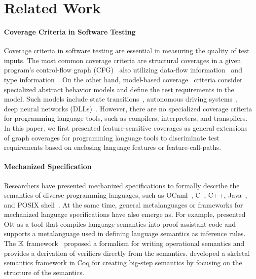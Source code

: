 \section{Related Work}\label{sec:related}

\paragraph{\textbf{Coverage Criteria in Software Testing}}
Coverage criteria in software testing are essential in measuring the quality of test inputs.
The most common coverage criteria are structural coverages in a given program's
control-flow graph (CFG)~\cite{cov-mcdc,cov-def} also utilizing
data-flow information~\cite{cov-dataflow} and type information~\cite{cov-partition}.
On the other hand, model-based coverage~\cite{cov-model-book} criteria consider
specialized abstract behavior models and define the test requirements in the model.
Such models include state transitions~\cite{cov-model-api},
autonomous driving systems~\cite{cov-param},
deep neural networks (DLLs)~\cite{cov-neuron,cov-k-neuron,cov-concolic-dll,
cov-fuzz-tensor, cov-fuzz-dl}.
However, there are no specialized coverage criteria for programming language
tools, such as compilers, interpreters, and transpilers.
In this paper, we first presented feature-sensitive coverages as general
extensions of graph coverages for programming language tools to discriminate
test requirements based on enclosing language features or feature-call-paths.


\paragraph{\textbf{Mechanized Specification}}

Researchers have presented mechanized specifications to formally describe the
semantics of diverse programming languages, such as
OCaml~\cite{ocaml-light-spec}, C~\cite{c-light-spec}, C++\cite{cpp-spec},
Java~\cite{k-java}, and POSIX shell~\cite{posix-shell-spec}.
%
At the same time, general metalanguages or frameworks for mechanized language
specifications have also emerge as.
%
For example, \citet{ott} presented Ott as a tool that compiles language
semantics into proof assistant code and supports a metalanguage used in defining
language semantics as inference rules.
%
The $\mathbb{K}$ framework~\cite{kframework} proposed a formalism for writing
operational semantics and provides a derivation of verifiers directly from the
semantics.
%
\citet{skel} developed a skeletal semantics framework in Coq for creating
big-step semantics by focusing on the structure of the semantics.

